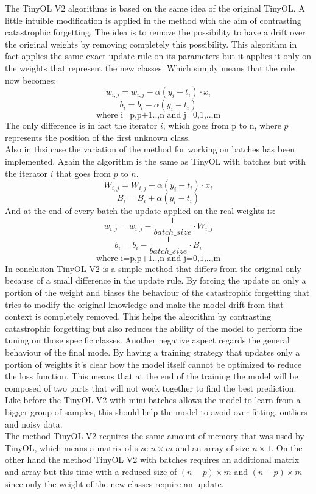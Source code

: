 \documentclass[12pt]{report}
\begin{document}
The TinyOL V2 algorithms is based on the same idea of the original TinyOL. A little intuible modification is applied in the method with the aim of contrasting catastrophic forgetting. The idea is to remove the possibility to have a drift over the original weights by removing completely this possibility. This algorithm in fact applies the same exact update rule on its parameters but it applies it only on the weights that represent the new classes. Which simply means that the rule now becomes:
    \[ w_{i,j} = w_{i,j} - \alpha (y_i - t_i) \cdot x_i \]
    \[ b_i = b_i - \alpha (y_i - t_i) \]
    \[ \text{where i=p,p+1..,n  and  j=0,1,..,m} \]
The only difference is in fact the iterator $i$, which goes from p to n, where $p$ represents the position of the first unknown class. \\
Also in thsi case the variation of the method for working on batches has been implemented. Again the algorithm is the same as TinyOL with batches but with the iterator $i$ that goes from $p$ to $n$.
    \[     W_{i,j} = W_{i,j} + \alpha (y_i - t_i) \cdot x_i\]
    \[     B_i = B_i + \alpha  (y_i - t_i) \]
And at the end of every batch the update applied on the real weights is:
    \[     w_{i,j} = w_{i,j} - \frac{1}{batch\_size} \cdot W_{i,j} \] 
    \[     b_i = b_i - \frac{1}{batch\_size} \cdot B_i \]
    \[ \text{where i=p,p+1..,n  and  j=0,1,..,m} \]
In conclusion TinyOL V2 is a simple method that differs from the original only because of a small difference in the update rule. By forcing the update on only a portion of the weight and biases the behaviour of the catastrophic forgetting that tries to modify the original knowledge and make the model drift from that context is completely removed. This helps the algorithm by contrasting catastrophic forgetting but also reduces the ability of the model to perform fine tuning on those specific classes. Another negative aspect regards the general behaviour of the final mode. By having a training strategy that updates only a portion of weights it's clear how the model itself cannot be optimized to reduce the loss function. This means that at the end of the training the model will be composed of two parts that will not work together to find the best prediction. Like before the TinyOL V2 with mini batches allows the model to learn from a bigger group of samples, this should help the model to avoid over fitting, outliers and noisy data. \\
The method TinyOL V2 requires the same amount of memory that was used by TinyOL, which means a matrix of size $n \times m$ and an array of size $n \times 1$. On the other hand the method TinyOL V2 with batches requires an additional matrix and array but this time with a reduced size of $(n-p) \times m$ and $(n-p) \times m$ since only the weight of the new classes require an update. 
\end{document}
